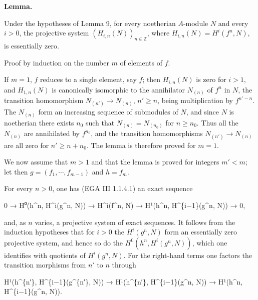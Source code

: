 \documentclass[
]{article}
\newenvironment{Shaded}{}{}
\newcommand{\NormalTok}[1]{#1}
\begin{document}
\textbf{Lemma.}

Under the hypotheses of Lemma 9, for every noetherian \(A\)-module \(N\)
and every \(i > 0\), the projective system
\((H_{i,n}(N))_{n \in \mathbb{Z}}\), where
\(H_{i,n}(N) = H^{i}(f^{n}, N)\), is essentially zero.

Proof by induction on the number \(m\) of elements of \(f\).

If \(m = 1\), \(f\) reduces to a single element, say \(f\); then
\(H_{i,n}(N)\) is zero for \(i > 1\), and \(H_{1,n}(N)\) is canonically
isomorphic to the annihilator \(N_{(n)}\) of \(f^{n}\) in \(N\), the
transition homomorphism \(N_{(n')} \to N_{(n)}\), \(n' \geqslant n\),
being multiplication by \(f^{n' - n}\). The \(N_{(n)}\) form an
increasing sequence of submodules of \(N\), and since \(N\) is
noetherian there exists \(n_{0}\) such that \(N_{(n)} = N_{(n_{0})}\)
for \(n \geqslant n_{0}\). Thus all the \(N_{(n)}\) are annihilated by
\(f^{n_{0}}\), and the transition homomorphisms \(N_{(n')} \to N_{(n)}\)
are all zero for \(n' \geqslant n + n_{0}\). The lemma is therefore
proved for \(m = 1\).

We now assume that \(m > 1\) and that the lemma is proved for integers
\(m' < m\); let then \(g = (f_{1}, \cdots, f_{m-1})\) and \(h = f_{m}\).

For every \(n > 0\), one has (EGA III 1.1.4.1) an exact sequence

\begin{Shaded}
\begin{Highlighting}[]
\NormalTok{0 → H⁰(h\^{}n, H\^{}i(g\^{}n, N)) → H\^{}i(f\^{}n, N) → H¹(h\^{}n, H\^{}\{i−1\}(g\^{}n, N)) → 0,}
\end{Highlighting}
\end{Shaded}

and, as \(n\) varies, a projective system of exact sequences. It follows
from the induction hypotheses that for \(i > 0\) the \(H^{i}(g^{n}, N)\)
form an essentially zero projective system, and hence so do the
\(H^{0}(h^{n}, H^{i}(g^{n}, N))\), which one identifies with quotients
of \(H^{i}(g^{n}, N)\). For the right-hand terms one factors the
transition morphisms from \(n'\) to \(n\) through

\begin{Shaded}
\begin{Highlighting}[]
\NormalTok{H¹(h\^{}\{n′\}, H\^{}\{i−1\}(g\^{}\{n′\}, N)) → H¹(h\^{}\{n′\}, H\^{}\{i−1\}(g\^{}n, N)) → H¹(h\^{}n, H\^{}\{i−1\}(g\^{}n, N)).}
\end{Highlighting}
\end{Shaded}
\end{document}
